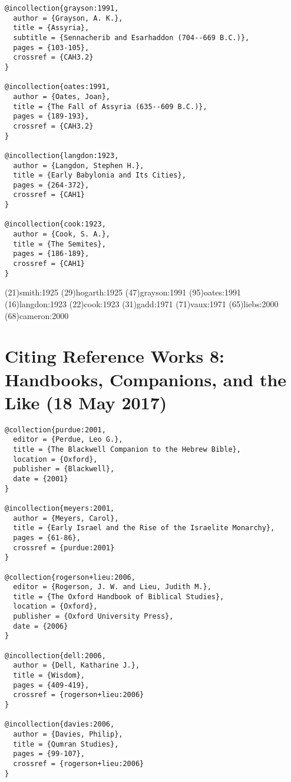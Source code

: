 \documentclass[a4paper]{article}
\begin{document}
\begin{verbatim}
@incollection{grayson:1991,
  author = {Grayson, A. K.},
  title = {Assyria},
  subtitle = {Sennacherib and Esarhaddon (704--669 B.C.)},
  pages = {103-105},
  crossref = {CAH3.2}
}

@incollection{oates:1991,
  author = {Oates, Joan},
  title = {The Fall of Assyria (635--609 B.C.)},
  pages = {189-193},
  crossref = {CAH3.2}
}

@incollection{langdon:1923,
  author = {Langdon, Stephen H.},
  title = {Early Babylonia and Its Cities},
  pages = {264-372},
  crossref = {CAH1}
}

@incollection{cook:1923,
  author = {Cook, S. A.},
  title = {The Semites},
  pages = {186-189},
  crossref = {CAH1}
}
\end{verbatim}

\examplecite(21){smith:1925}
\examplecite(29){hogarth:1925}
\examplecite(47){grayson:1991}
\examplecite(95){oates:1991}
\examplecite(16){langdon:1923}
\examplecite(22){cook:1923}
\examplecite(31){gadd:1971}
\examplecite(71){vaux:1971}
\examplecite(65){liebs:2000}
\examplecite(68){cameron:2000}
\exampleabbreviations
\examplebibliography
{}

\section{Citing Reference Works 8: Handbooks, Companions, and the Like (18 May 2017)}

\begin{verbatim}
@collection{purdue:2001,
  editor = {Perdue, Leo G.},
  title = {The Blackwell Companion to the Hebrew Bible},
  location = {Oxford},
  publisher = {Blackwell},
  date = {2001}
}

@incollection{meyers:2001,
  author = {Meyers, Carol},
  title = {Early Israel and the Rise of the Israelite Monarchy},
  pages = {61-86},
  crossref = {purdue:2001}
}

@collection{rogerson+lieu:2006,
  editor = {Rogerson, J. W. and Lieu, Judith M.},
  title = {The Oxford Handbook of Biblical Studies},
  location = {Oxford},
  publisher = {Oxford University Press},
  date = {2006}
}

@incollection{dell:2006,
  author = {Dell, Katharine J.},
  title = {Wisdom},
  pages = {409-419},
  crossref = {rogerson+lieu:2006}
}

@incollection{davies:2006,
  author = {Davies, Philip},
  title = {Qumran Studies},
  pages = {99-107},
  crossref = {rogerson+lieu:2006}
}
\end{verbatim}
\end{document}
